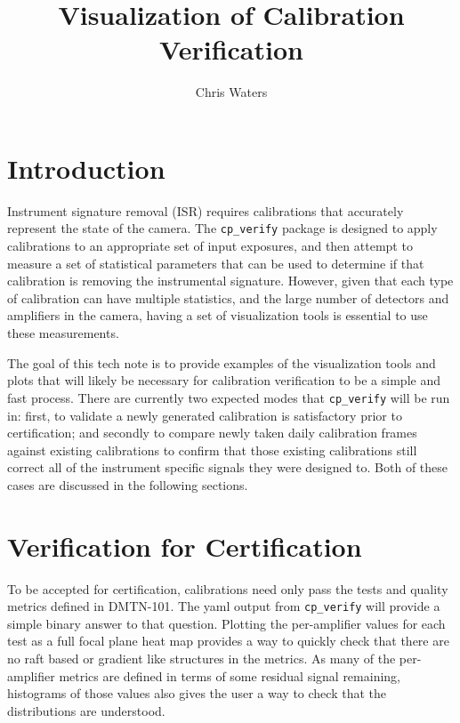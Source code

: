 \documentclass[DM,authoryear,toc]{lsstdoc}
\title{Visualization of Calibration Verification}
\author{%
Chris Waters
}
\date{\vcsDate}
\begin{document}
\maketitle

\section{Introduction}

Instrument signature removal (ISR) requires calibrations that accurately represent the state of the camera.  The \verb|cp_verify| package is designed to apply calibrations to an appropriate set of input exposures, and then attempt to measure a set of statistical parameters that can be used to determine if that calibration is removing the instrumental signature.  However, given that each type of calibration can have multiple statistics, and the large number of detectors and amplifiers in the camera, having a set of visualization tools is essential to use these measurements.

The goal of this tech note is to provide examples of the visualization tools and plots that will likely be necessary for calibration verification to be a simple and fast process.  There are currently two expected modes that \verb|cp_verify| will be run in: first, to validate a newly generated calibration is satisfactory prior to certification; and secondly to compare newly taken daily calibration frames against existing calibrations to confirm that those existing calibrations still correct all of the instrument specific signals they were designed to.  Both of these cases are discussed in the following sections.

\section{Verification for Certification}

To be accepted for  certification, calibrations need only pass the tests and quality metrics defined in DMTN-101.  The yaml output from \verb|cp_verify| will provide a simple binary answer to that question.  Plotting the per-amplifier values for each test as a full focal plane heat map provides a way to quickly check that there are no raft based or gradient like structures in the metrics.  As many of the per-amplifier metrics are defined in terms of some residual signal remaining, histograms of those values also gives the user a way to check that the distributions are understood.
\end{document}
